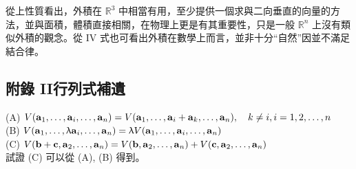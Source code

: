 從上性質看出，外積在 $\mathbb{R}^3$ 中相當有用，至少提供一個求與二向垂直的向量的方法，並與面積，體積直接相關，在物理上更是有其重要性，只是一般 $\mathbb{R}^n$ 上沒有類似外積的觀念。從 IV 式也可看出外積在數學上而言，並非十分“自然”因並不滿足結合律。

\subsection*{附錄 II\quad 行列式補遺}\label{sec:b6-app2}
\resetsectcounters

\begin{theorem}\label{thm:b6-1-app2}
(A) $V(\boldsymbol{\mathbf{a}}_1, \dots, \boldsymbol{\mathbf{a}}_i, \dots, \boldsymbol{\mathbf{a}}_n) = V(\boldsymbol{\mathbf{a}}_1, \dots, \boldsymbol{\mathbf{a}}_i + \boldsymbol{\mathbf{a}}_k, \dots, \boldsymbol{\mathbf{a}}_n), \quad k \ne i, i=1, 2, \dots, n$ \\
(B) $V(\boldsymbol{\mathbf{a}}_1, \dots, \uplambda\boldsymbol{\mathbf{a}}_i, \dots, \boldsymbol{\mathbf{a}}_n) = \uplambda V(\boldsymbol{\mathbf{a}}_1, \dots, \boldsymbol{\mathbf{a}}_i, \dots, \boldsymbol{\mathbf{a}}_n)$ \\
(C) $V(\boldsymbol{\mathbf{b}}+\boldsymbol{\mathbf{c}}, \boldsymbol{\mathbf{a}}_2, \dots, \boldsymbol{\mathbf{a}}_n) = V(\boldsymbol{\mathbf{b}}, \boldsymbol{\mathbf{a}}_2, \dots, \boldsymbol{\mathbf{a}}_n) + V(\boldsymbol{\mathbf{c}}, \boldsymbol{\mathbf{a}}_2, \dots, \boldsymbol{\mathbf{a}}_n)$ \\
試證 (C) 可以從 (A), (B) 得到。
\end{theorem}

